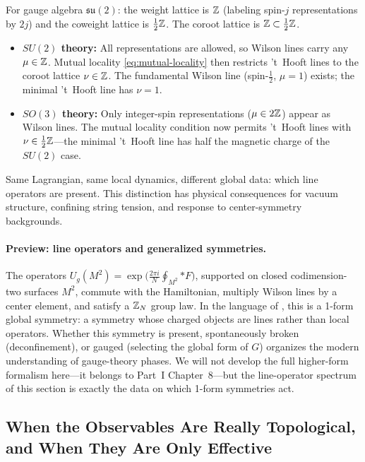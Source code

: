 \begin{example}[$SU(2)$ vs.~$SO(3)$]\label{ex:su2-vs-so3}
For gauge algebra $\mathfrak{su}(2)$: the weight lattice is $\mathbb{Z}$ (labeling spin-$j$ representations by $2j$) and the coweight lattice is $\tfrac{1}{2}\mathbb{Z}$. The coroot lattice is $\mathbb{Z}\subset\tfrac{1}{2}\mathbb{Z}$.
\begin{itemize}
  \item \textbf{$SU(2)$ theory:} All representations are allowed, so Wilson lines carry any $\mu\in\mathbb{Z}$. Mutual locality \eqref{eq:mutual-locality} then restricts 't~Hooft lines to the coroot lattice $\nu\in\mathbb{Z}$. The fundamental Wilson line (spin-$\tfrac{1}{2}$, $\mu=1$) exists; the minimal 't~Hooft line has $\nu=1$.
  \item \textbf{$SO(3)$ theory:} Only integer-spin representations ($\mu\in 2\mathbb{Z}$) appear as Wilson lines. The mutual locality condition now permits 't~Hooft lines with $\nu\in\tfrac{1}{2}\mathbb{Z}$---the minimal 't~Hooft line has half the magnetic charge of the $SU(2)$ case.
\end{itemize}
Same Lagrangian, same local dynamics, different global data: which line operators are present. This distinction has physical consequences for vacuum structure, confining string tension, and response to center-symmetry backgrounds.
\end{example}

\paragraph{Preview: line operators and generalized symmetries.}
The operators $U_g(M^2) = \exp\bigl(\frac{2\pi i}{N}\oint_{M^2} {*F}\bigr)$, supported on closed codimension-two surfaces $M^2$, commute with the Hamiltonian, multiply Wilson lines by a center element, and satisfy a $\mathbb{Z}_N$ group law. In the language of \cite{GaiottoKapustinSeibergWillett2015GeneralizedSymmetries}, this is a 1-form global symmetry: a symmetry whose charged objects are lines rather than local operators. Whether this symmetry is present, spontaneously broken (deconfinement), or gauged (selecting the global form of $G$) organizes the modern understanding of gauge-theory phases. We will not develop the full higher-form formalism here---it belongs to Part~I Chapter~8---but the line-operator spectrum of this section is exactly the data on which 1-form symmetries act.

\subsection{When the Observables Are Really Topological, and When They Are Only Effective}
\label{subsec:when-topological}

